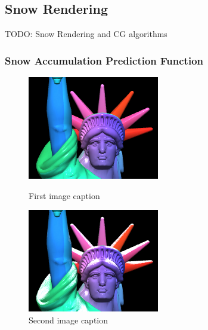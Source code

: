 \documentclass{article}
\begin{document}
 
\subsection {Snow Rendering}
TODO: Snow Rendering and CG algorithms
\subsubsection {Snow Accumulation Prediction Function}



\begin{figure}[h]
  \centering
  \begin{minipage}{0.45\textwidth}
      \centering
      \includegraphics[width=\textwidth]{images/HeadManualWithoutSnow.png}
      \caption{First image caption}
      \label{fig:image1}
  \end{minipage}\hfill
  \begin{minipage}{0.45\textwidth}
      \centering
      \includegraphics[width=\textwidth]{images/HeadManualWithSnow.png}
      \caption{Second image caption}
      \label{fig:image2}
  \end{minipage}
\end{figure}
\end{document}
